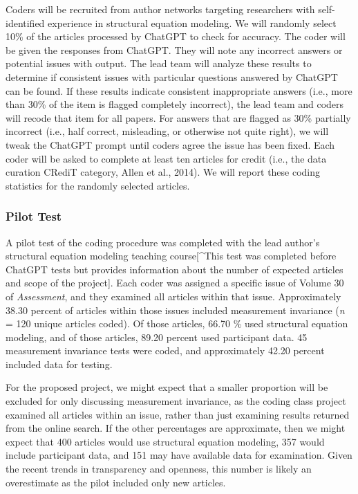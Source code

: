 \documentclass[
  man]{apa7}
\begin{document}
Coders will be recruited from author networks targeting researchers with self-identified experience in structural equation modeling. We will randomly select 10\% of the articles processed by ChatGPT to check for accuracy. The coder will be given the responses from ChatGPT. They will note any incorrect answers or potential issues with output. The lead team will analyze these results to determine if consistent issues with particular questions answered by ChatGPT can be found. If these results indicate consistent inappropriate answers (i.e., more than 30\% of the item is flagged completely incorrect), the lead team and coders will recode that item for all papers. For answers that are flagged as 30\% partially incorrect (i.e., half correct, misleading, or otherwise not quite right), we will tweak the ChatGPT prompt until coders agree the issue has been fixed. Each coder will be asked to complete at least ten articles for credit (i.e., the data curation CRediT category, Allen et al., 2014). We will report these coding statistics for the randomly selected articles.

\subsubsection{Pilot Test}\label{pilot-test}

A pilot test of the coding procedure was completed with the lead author's structural equation modeling teaching course{[}\^{}This test was completed before ChatGPT tests but provides information about the number of expected articles and scope of the project{]}. Each coder was assigned a specific issue of Volume 30 of \emph{Assessment}, and they examined all articles within that issue. Approximately 38.30 percent of articles within those issues included measurement invariance (\emph{n} = 120 unique articles coded). Of those articles, 66.70 \% used structural equation modeling, and of those articles, 89.20 percent used participant data. 45 measurement invariance tests were coded, and approximately 42.20 percent included data for testing.

For the proposed project, we might expect that a smaller proportion will be excluded for only discussing measurement invariance, as the coding class project examined all articles within an issue, rather than just examining results returned from the online search. If the other percentages are approximate, then we might expect that 400 articles would use structural equation modeling, 357 would include participant data, and 151 may have available data for examination. Given the recent trends in transparency and openness, this number is likely an overestimate as the pilot included only new articles.
\end{document}
